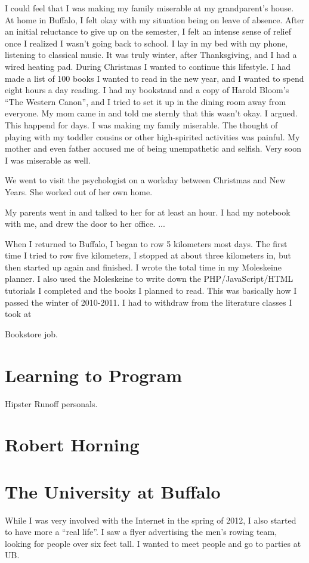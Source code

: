 \documentclass[12pt]{article}
\begin{document}
I could feel that I was making my family miserable at my grandparent's house.
At home in Buffalo, I felt okay with my situation being on leave of absence.
After an initial reluctance to give up on the semester, I felt an intense sense
of relief once I realized I wasn't going back to school.  I lay in my bed with my
phone, listening to classical music.  It was truly winter, after Thanksgiving,
and I had a wired heating pad.  During Christmas I wanted to continue this
lifestyle.  I had made a list of 100 books I wanted to read in the new year,
and I wanted to spend eight hours a day reading.  I had my bookstand and a copy
of Harold Bloom's ``The Western Canon'', and I tried to set it up in the dining
room away from everyone.  My mom came in and told me sternly that this wasn't
okay.  I argued.  This happend for days.  I was making my family miserable.  The
thought of playing with my toddler cousins or other high-spirited activities was
painful.  My mother and even father accused me of being unempathetic and
selfish.  Very soon I was miserable as well.

We went to visit the psychologist on a workday between Christmas and New
Years.  She worked out of her own home. 

My parents went in and talked to her for at least an hour.  I had my notebook
with me, and drew the door to her office.   ...

When I returned to Buffalo, I began to row 5 kilometers most days.  The first
time I tried to row five kilometers, I stopped at about three kilometers in, but
then started up again and finished.  I wrote the total time in my Moleskeine
planner.  I also used the Moleskeine to write down the PHP/JavaScript/HTML
tutorials I completed and the books I planned to read.  This was basically how I
passed the winter of 2010-2011.  I had to withdraw from the literature classes I
took at 

Bookstore job.  

\section{Learning to Program}
Hipster Runoff personals.

\section{Robert Horning}

\section{The University at Buffalo}
While I was very involved with the Internet in the spring of 2012, I also
started to have more a ``real life''.  I saw a flyer advertising the men's
rowing team, looking for people over six feet tall.   I wanted to
meet people and go to parties at UB. 
\end{document}

